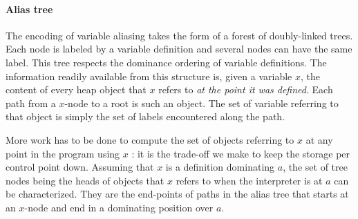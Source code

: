 \documentclass[11pt]{article}
\begin{document}
\paragraph{Alias tree} The encoding of variable aliasing takes the form of a forest of doubly-linked trees.
Each node is labeled by a variable definition and several nodes can have the same label.
This tree respects the dominance ordering of variable definitions.
The information readily available from this structure is, given a variable $x$, the content of every heap object that $x$ refers to \emph{at the point it was defined}. Each path from a $x$-node to a root is such an object. The set of variable referring to that object is simply the set of labels encountered along the path.

More work has to be done to compute the set of objects referring to $x$ at any point in the program using $x$ : it is the trade-off we make to keep the storage per control point down.
Assuming that $x$ is a definition dominating $a$, the set of tree nodes being the heads of objects that $x$ refers to when the interpreter is at $a$ can be characterized. They are the end-points of paths in the alias tree that starts at an $x$-node and end in a dominating position over $a$.
\end{document}
